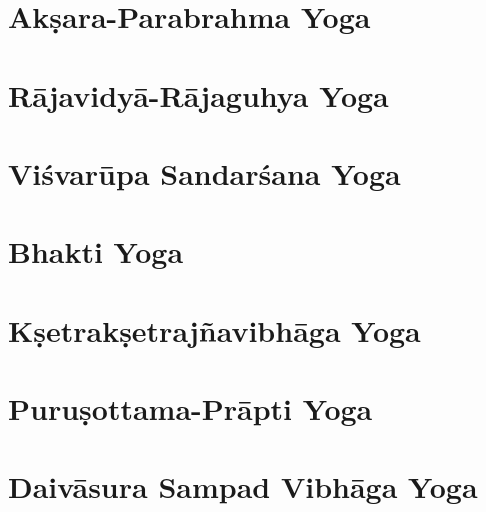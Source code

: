 \documentclass{scrbook}
\begin{document}
\chapter{Akṣara-Parabrahma Yoga}
\begin{multicols}{2}
    
\end{multicols}

\chapter{Rājavidyā-Rājaguhya Yoga}
\begin{multicols}{2}
    
\end{multicols}

\setcounter{chapter}{10}

\chapter{Viśvarūpa Sandarśana Yoga}
\begin{multicols}{2}
    
\end{multicols}

\chapter{Bhakti Yoga}
\begin{multicols}{2}
    
\end{multicols}

\chapter{Kṣetrakṣetrajñavibhāga Yoga}
\begin{multicols}{2}
    
\end{multicols}

\setcounter{chapter}{14}

\chapter{Puruṣottama-Prāpti Yoga}
\begin{multicols}{2}
    
\end{multicols}

\chapter{Daivāsura Sampad Vibhāga Yoga}
\begin{multicols}{2}
    
\end{multicols}
\end{document}
